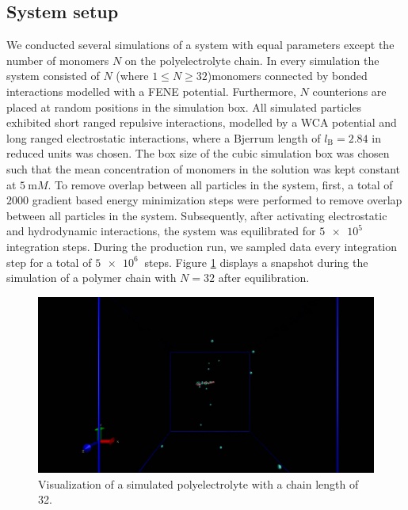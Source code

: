 \subsection{System setup}
We conducted several simulations of a system with equal parameters except the number of monomers $N$ on the polyelectrolyte chain. In every simulation the system consisted of $N$ (where $1\le N \ge 32$)monomers connected by bonded interactions modelled with a FENE potential. Furthermore, $N$ counterions are placed at random positions in the simulation box. All simulated particles exhibited short ranged repulsive interactions, modelled by a WCA potential and long ranged electrostatic interactions, where a Bjerrum length of $l_\text{B} = 2.84$ in reduced units was chosen. The box size of the cubic simulation box was chosen such that the mean concentration of monomers in the solution was kept constant at $\SI{5}{\milli M}$. To remove overlap between all particles in the system, first, a total of $2000$ gradient based energy minimization steps were performed to remove overlap between all particles in the system. Subsequently, after activating electrostatic and hydrodynamic interactions, the system was equilibrated for $\SI{5e5}{}$ integration steps. During the production run, we sampled data every integration step for a total of $\SI{5e6}{}$ steps. Figure \ref{fig:vmd} displays a snapshot during the simulation of a polymer chain with $N=32$ after equilibration.
\begin{figure}[H]
	\centering
	\includegraphics[width=\columnwidth]{Analysis_1/VMD_visualization}
	\captionsetup{width=\columnwidth}
	\caption{Visualization of a simulated polyelectrolyte with a chain length of 32.}
	\label{fig:vmd}
\end{figure}
